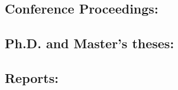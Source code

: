 \documentclass{CML_Seminar_Template}
\begin{document}
\cite[]{Bal1994}

\subsection*{Conference Proceedings:} 

\cite[]{GrPr2003}

\subsection*{Ph.D. and Master's theses:}

\cite[]{Dou1996}

\subsection*{Reports:} 

\cite[]{BeMa1993}


%


\end{document}

